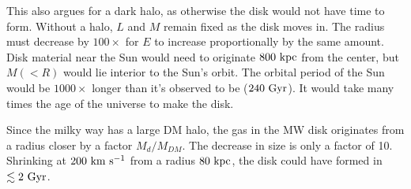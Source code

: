 \documentclass[]{article}
\begin{document}
This also argues for a dark halo, as otherwise the disk would
not have time to form.  Without a halo, $L$ and $M$ remain
fixed as the disk moves in.  The radius must decrease by $100\times$
for $E$ to increase proportionally by the same amount.
Disk material near the Sun would need to originate $800~\mathrm{kpc}$
from the center, but $M(<R)$ would lie interior to the Sun's orbit.
The orbital period of the Sun would be $1000\times$ longer than
it's observed to be ($240~\mathrm{Gyr}$).  It would take many times the
age of the universe to make the disk.

Since the milky way has a large DM halo, the gas in the MW disk
originates from a radius closer by a factor $M_d/M_{DM}$. The
decrease in size is only a factor of 10.  Shrinking at
$200~\mathrm{km}~\mathrm{s}^{-1}$ from a radius $80~\mathrm{kpc}$, the disk could
have formed in $\lesssim2~\mathrm{Gyr}$.
\end{document}
